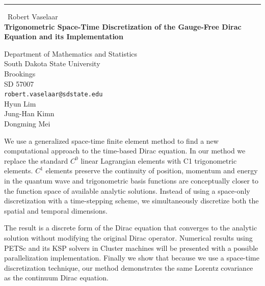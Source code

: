 \documentclass{report}
\begin{document}
\begin{center}
\rule{6in}{1pt} \
{\large Robert Vaselaar \\
{\bf Trigonometric Space-Time Discretization of the Gauge-Free Dirac Equation and its Implementation}}

Department of Mathematics and Statistics \\ South Dakota State University \\ Brookings \\ SD 57007
\\
{\tt robert.vaselaar@sdstate.edu}\\
Hyun Lim\\
Jung-Han Kimn\\
Dongming Mei\end{center}

We use a generalized space-time finite element method to find a new
computational approach to the time-based Dirac equation. In our method we
replace the standard $C^0$ linear Lagrangian elements with C1
trigonometric elements. $C^1$ elements preserve the continuity of
position, momentum and energy in the quantum wave and trigonometric basis
functions are conceptually closer to the function space of available
analytic solutions. Instead of using a space-only discretization with a
time-stepping scheme, we simultaneously discretize both the spatial and
temporal dimensions.

The result is a discrete form of the Dirac equation that converges to the
analytic solution without modifying the original Dirac operator.
Numerical results using PETSc and its KSP solvers in Cluster machines
will be presented with a possible parallelization implementation. Finally
we show that because we use a space-time discretization technique, our
method demonstrates the same Lorentz covariance as the continuum Dirac
equation.
\end{document}
